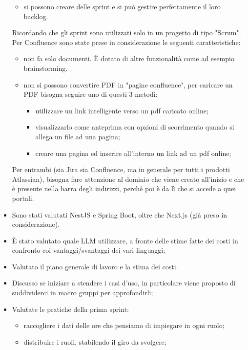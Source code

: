 \begin{itemize}
\begin{itemize}
    \item si possono creare delle sprint e si può gestire perfettamente il loro backlog.
    \end{itemize}
    Ricordando che gli sprint sono utilizzati solo in un progetto di tipo "Scrum".
    Per Confluence sono state prese in considerazione le seguenti caratteristiche:
    \begin{itemize}
        \item non fa solo documenti. È dotato di altre funzionalità come ad esempio brainstorming.
        \item non si possono convertire PDF in "pagine confluence", per caricare un PDF bisogna seguire uno di questi 3  metodi:
        \begin{itemize}
            \item utilizzare un link intelligente verso un pdf caricato online;
            \item visualizzarlo come anteprima con opzioni di scorrimento quando si allega un file ad una pagina;
            \item creare una pagina ed inserire all'interno un link ad un pdf online;
        \end{itemize}
    \end{itemize}
    Per entrambi (sia Jira sia Confluence, ma in generale per tutti i prodotti Atlassian), bisogna fare attenzione al dominio che viene creato all'inizio e che è presente nella barra degli indirizzi, perché poi è da lì che si accede a quei portali.
    \item Sono stati valutati NestJS e Spring Boot, oltre che Next.js (già preso in considerazione).
    \item È stato valutato quale LLM utilizzare, a fronte delle stime fatte dei costi in confronto coi vantaggi/svantaggi dei vari linguaggi;
    \item Valutato il piano generale di lavoro e la stima dei costi.
    \item Discusso se iniziare a stendere i casi d'uso, in particolare viene proposto di suddividerci in macro gruppi per approfondirli;
    \item Valutate le pratiche della prima sprint:
    \begin{itemize}
        \item raccogliere i dati delle ore che pensiamo di impiegare in ogni ruolo;
        \item distribuire i ruoli, stabilendo il giro da svolgere;
    \end{itemize}

\end{itemize}
